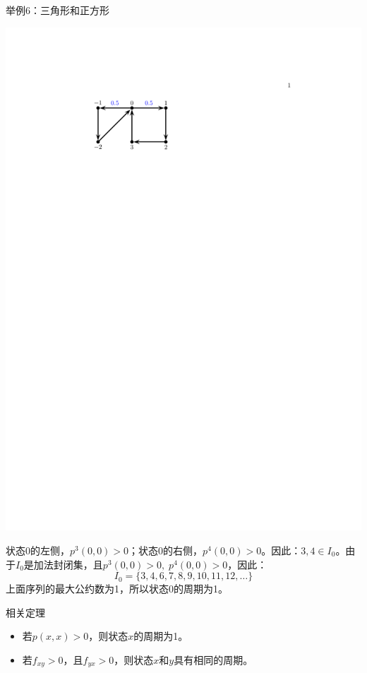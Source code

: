 \documentclass[t]{beamer}
\begin{document}
\begin{frame}{举例6：三角形和正方形}
\begin{center}
    \includegraphics{fig/markov3.pdf}
\end{center}
状态0的左侧，$p^3(0,0)>0$；状态0的右侧，$p^4(0,0)>0$。因此：$3,4\in I_0$。由于$I_0$是加法封闭集，且$p^3(0,0)>0,\; p^4(0,0)>0$，因此：
\[I_0=\{3,4,6,7,8,9,10,11,12,\ldots\} \]
上面序列的最大公约数为1，所以状态0的周期为1。
\end{frame}


\begin{frame}{相关定理}
\begin{itemize}
    \item 若$p(x,x)>0$，则状态$x$的周期为1。
    \item 若$f_{xy}>0$，且$f_{yx}>0$，则状态$x$和$y$具有相同的周期。
\end{itemize}
\end{frame}
\end{document}
